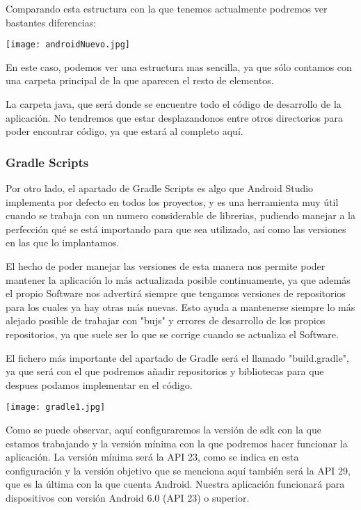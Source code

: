 Comparando esta estructura con la que tenemos actualmente podremos ver bastantes diferencias:

\texttt{[image: androidNuevo.jpg]}

En este caso, podemos ver una estructura mas sencilla, ya que sólo contamos con una carpeta principal de la que aparecen el resto de elementos. 

La carpeta java, que será donde se encuentre todo el código de desarrollo de la aplicación. No tendremos que estar desplazandonos entre otros directorios para poder encontrar código, ya que estará al completo aquí.

\subsubsection{Gradle Scripts}

Por otro lado, el apartado de Gradle Scripts es algo que Android Studio implementa por defecto en todos los proyectos, y es una herramienta muy útil cuando se trabaja con un numero considerable de librerias, pudiendo manejar a la perfección qué se está importando para que sea utilizado, así como las versiones en las que lo implantamos.

El hecho de poder manejar las versiones de esta manera nos permite poder mantener la aplicación lo más actualizada posible continuamente, ya que además el propio Software nos advertirá siempre que tengamos versiones de repositorios para los cuales ya hay otras más nuevas. Esto ayuda a mantenerse siempre lo más alejado posible de trabajar con "bujs" y errores de desarrollo de los propios repositorios, ya que suele ser lo que se corrige cuando se actualiza el Software.

El fichero más importante del apartado de Gradle será el llamado "build.gradle", ya que será con el que podremos añadir repositorios y bibliotecas para que despues podamos implementar en el código.

\texttt{[image: gradle1.jpg]}

Como se puede observar, aquí configuraremos la versión de sdk con la que estamos trabajando y la versión mínima con la que podremos hacer funcionar la aplicación. La versión mínima será la API 23, como se indica en esta configuración y la versión objetivo que se menciona aquí también será la API 29, que es la última con la que cuenta Android. Nuestra aplicación funcionará para dispositivos con versión Android 6.0 (API 23) o superior.

